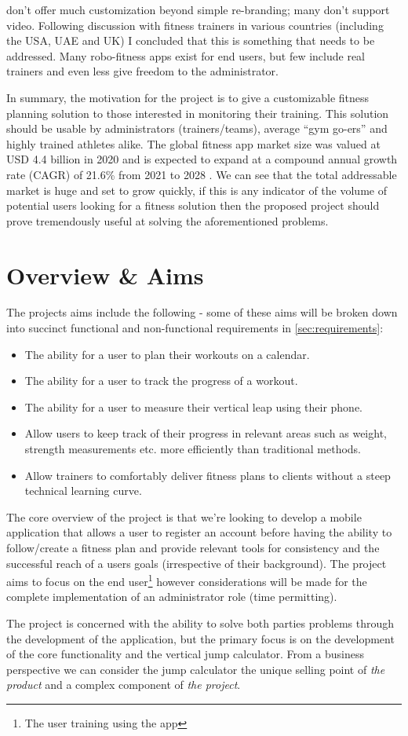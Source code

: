 don't offer much customization beyond simple re-branding; many don't support video.
Following discussion with fitness trainers in various countries (including the USA, UAE and UK)
I concluded that this is something that needs to be addressed. Many robo-fitness apps
exist for end users, but few include real trainers and even less give
freedom to the administrator.
\par
In summary, the motivation for the project is to give a customizable fitness planning
solution to those interested in monitoring their training. This solution should be
usable by administrators (trainers/teams), average ``gym go-ers'' and
highly trained athletes alike. The global fitness app market size
was valued at USD 4.4 billion in 2020 and is expected to expand at a
compound annual growth rate (CAGR) of 21.6\% from 2021 to 2028 \cite{fitness-app-market-size}.
We can see that the total addressable market is huge and set to grow quickly,
if this is any indicator of the volume of potential users looking for a fitness solution then the proposed
project should prove tremendously useful at solving the aforementioned problems.
\pagebreak

\section{Overview \& Aims}
\label{sec:intro_overview}
The projects aims include the following - some of these aims will be broken down into
succinct functional and non-functional requirements in \cref{sec:requirements}:
\begin{itemize}
	\item The ability for a user to plan their workouts on a calendar.
	\item The ability for a user to track the progress of a workout.
	\item The ability for a user to measure their vertical leap using their phone.
	\item Allow users to keep track of their progress in relevant areas
	      such as weight, strength measurements etc. more efficiently than traditional methods.
	\item Allow trainers to comfortably deliver fitness plans to
	      clients without a steep technical learning curve.
\end{itemize}
The core overview of the project is that we're looking to develop a mobile application that
allows a user to register an account before having the ability to follow/create a fitness plan
and provide relevant tools for consistency and the successful reach of a users goals
(irrespective of their background). The project aims to focus on the 
end user\footnote{The user training using the app} however considerations will be made for 
the complete implementation of an administrator role (time permitting).
\par
The project is concerned with the ability to solve both parties problems through the development
of the application, but the primary focus is on the development of the core functionality
and the vertical jump calculator. From a business perspective we can consider the jump calculator
the unique selling point of \textit{the product} and
a complex component of \textit{the project}.
